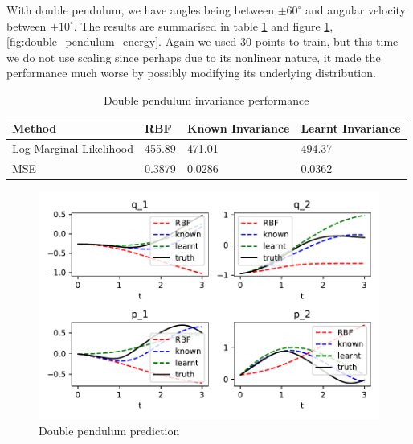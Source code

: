 \documentclass{statsmsc}
\begin{document}
With double pendulum, we have angles being between $\pm 60^\circ$ and angular velocity between $\pm 10^\circ$.
The results are summarised in table \ref{tab:double_pendulum_performance} and figure \ref{fig:double_pendulum_prediction}, \ref{fig:double_pendulum_energy}.
Again we used 30 points to train, but this time we do not use scaling since perhaps due to its nonlinear nature, it made the performance much worse by possibly modifying its underlying distribution.

\begin{table}[H]
  \centering
  \begin{tabular}{l l l l}
    \hline
Method           & RBF & Known Invariance&  Learnt Invariance\\
  \hline
Log Marginal Likelihood & 455.89 & 471.01 & 494.37  \\
MSE & 0.3879 & 0.0286 & 0.0362 \\
    \hline
  \end{tabular}
  \caption{Double pendulum invariance performance}
  \label{tab:double_pendulum_performance}
\end{table}

\begin{figure}[H] 
  \includegraphics[width=0.8\linewidth]{../codes/figures/double_pendulum_predicted.pdf}
  \centering
  \caption{Double pendulum prediction}
  \label{fig:double_pendulum_prediction}
\end{figure}
\end{document}
